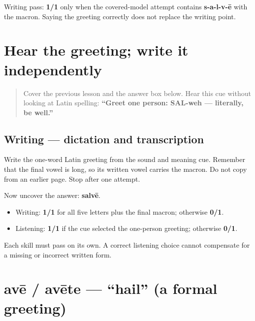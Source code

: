 \begin{tcolorbox}[breakable,colback=teal!4,colframe=teal!35!black,title={Before you move on}]
Writing pass: \textbf{1/1} only when the covered-model attempt contains \textbf{s-a-l-v-ē} with the macron. Saying the greeting correctly does not replace the writing point.
\end{tcolorbox}
\section[heard greeting]{Hear the greeting; write it independently}

\label{lesson:LA-W01-salve-dictation}



\begin{quote}
Cover the previous lesson and the answer box below. Hear this cue without looking at Latin spelling: \textbf{“Greet one person: SAL-weh — literally, be well.”}
\end{quote}

\subsection*{Writing — dictation and transcription}
Write the one-word Latin greeting from the sound and meaning cue. Remember that the final vowel is long, so its written vowel carries the macron. Do not copy from an earlier page. Stop after one attempt.

\begin{tcolorbox}[breakable,colback=teal!4,colframe=teal!35!black,title={Before you move on}]
Now uncover the answer: \textbf{salvē}.

\begin{itemize}
\raggedright
  \item Writing: \textbf{1/1} for all five letters plus the final macron; otherwise \textbf{0/1}.
  \item Listening: \textbf{1/1} if the cue selected the one-person greeting; otherwise \textbf{0/1}.
\end{itemize}

Each skill must pass on its own. A correct listening choice cannot compensate for a missing or incorrect written form.
\end{tcolorbox}
\section[avē / avēte]{avē / avēte — \textquotedblleft{}hail\textquotedblright{} (a formal greeting)}

